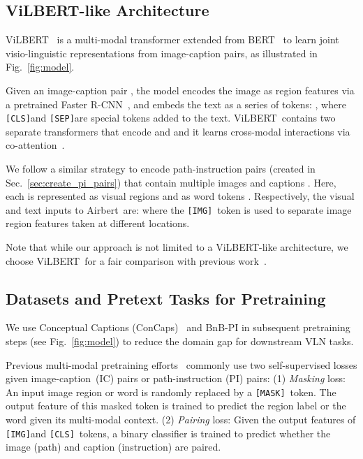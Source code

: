 \RequirePackage[dvipsnames,table]{xcolor} \documentclass[10pt,twocolumn,letterpaper]{article}
\newcommand{\vilbert}{ViLBERT}
\newcommand{\airbert}{Airbert}
\newcommand{\airbnb}{BnB}
\newcommand{\mask}{\texttt{[MASK]}}
\newcommand{\cls}{\texttt{[CLS]}}
\newcommand{\sep}{\texttt{[SEP]}}
\newcommand{\imgtok}{\texttt{[IMG]}}
\begin{document}
\subsection{\vilbert-like Architecture}
\vilbert~\cite{lu2019vilbert} is a multi-modal transformer extended from BERT~\cite{devlin2018bert} to learn joint visio-linguistic representations from image-caption pairs, as illustrated in Fig.~\ref{fig:model}.

Given an image-caption pair , the model encodes the image as region features  via a pretrained Faster R-CNN~\cite{anderson2017butd}, and embeds the text as a series of tokens: , where \cls and \sep are special tokens added to the text.
\vilbert~contains two separate transformers that encode  and  and it learns cross-modal interactions via co-attention~\cite{lu2019vilbert}.

We follow a similar strategy to encode path-instruction pairs (created in Sec.~\ref{sec:create_pi_pairs}) that contain multiple images and captions .
Here, each  is represented as visual regions  and  as word tokens .
Respectively, the visual and text inputs to \airbert~are:
{\small
}where the \imgtok~token is used to separate image region features taken at different locations.

Note that while our approach is not limited to a \vilbert-like architecture, we choose \vilbert~for a fair comparison with previous work~\cite{majumdar2020vlnbert}.



\subsection{Datasets and Pretext Tasks for Pretraining}
We use Conceptual Captions (ConCaps)~\cite{ConceptualCaptions} and \airbnb-PI in subsequent pretraining steps (see Fig.~\ref{fig:model}) to reduce the domain gap for downstream VLN tasks.

Previous multi-modal pretraining efforts~\cite{lu2019vilbert, majumdar2020vlnbert, huang2019transferable} commonly use two self-supervised losses given image-caption~(IC) pairs or path-instruction (PI) pairs:
(1) \emph{Masking} loss:
An input image region or word is randomly replaced by a \mask~token.
The output feature of this masked token is trained to predict the region label or the word given its multi-modal context.
(2) \emph{Pairing} loss: 
Given the output features of \imgtok and \cls~tokens, a binary classifier is trained to predict whether the image (path) and caption (instruction) are paired.
\end{document}
